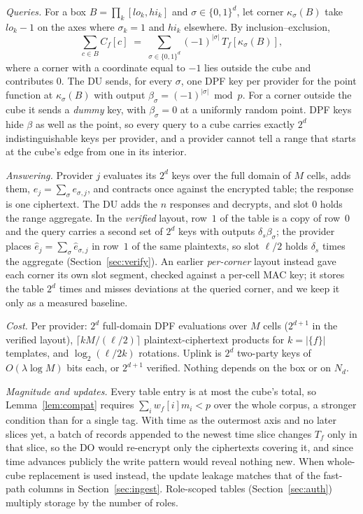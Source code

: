 \documentclass[a4paper,fleqn]{cas-sc}
\begin{document}
\emph{Queries.} For a box $B=\prod_k[\mathit{lo}_k,\mathit{hi}_k]$ and
$\sigma\in\{0,1\}^d$, let corner $\kappa_\sigma(B)$ take $\mathit{lo}_k-1$ on
the axes where $\sigma_k=1$ and $\mathit{hi}_k$ elsewhere. By
inclusion--exclusion,
\begin{equation}
\label{eq:ie}
\sum_{c\in B} C_f[c] \;=\; \sum_{\sigma\in\{0,1\}^d} (-1)^{|\sigma|}\,
T_f[\kappa_\sigma(B)],
\end{equation}
where a corner with a coordinate equal to $-1$ lies outside the cube and
contributes $0$. The DU sends, for every $\sigma$, one DPF key per provider
for the point function at $\kappa_\sigma(B)$ with output
$\beta_\sigma=(-1)^{|\sigma|}\bmod p$. For a corner outside the cube it sends a
\emph{dummy} key, with $\beta_\sigma=0$ at a uniformly random point. DPF keys
hide $\beta$ as well as the point, so every query to a cube carries exactly
$2^d$ indistinguishable keys per provider, and a provider cannot tell a range
that starts at the cube's edge from one in its interior.

\emph{Answering.} Provider $j$ evaluates its $2^d$ keys over the full domain of
$M$ cells, adds them, $e_j=\sum_\sigma e_{\sigma,j}$, and contracts once against
the encrypted table; the response is one ciphertext. The DU adds the $n$
responses and decrypts, and slot $0$ holds the range aggregate. In the
\emph{verified} layout, row~$1$ of the table is a copy of row~$0$ and the query
carries a second set of $2^d$ keys with outputs $\delta_s\beta_\sigma$; the
provider places $\hat e_j=\sum_\sigma\hat e_{\sigma,j}$ in row~$1$ of the same
plaintexts, so slot $\ell/2$ holds $\delta_s$ times the aggregate
(Section~\ref{sec:verify}). An earlier \emph{per-corner} layout instead gave
each corner its own slot segment, checked against a per-cell MAC key; it stores
the table $2^d$ times and misses deviations at the queried corner, and we keep
it only as a measured baseline.

\emph{Cost.} Per provider: $2^d$ full-domain DPF evaluations over $M$ cells
($2^{d+1}$ in the verified layout), $\lceil kM/(\ell/2)\rceil$
plaintext-ciphertext products for $k=|\{f\}|$ templates, and
$\log_2(\ell/2k)$ rotations. Uplink is $2^d$ two-party keys of
$O(\lambda\log M)$ bits each, or $2^{d+1}$ verified. Nothing depends on the box
or on $N_d$.

\emph{Magnitude and updates.} Every table entry is at most the cube's total,
so Lemma~\ref{lem:compat} requires $\sum_i w_f[i]m_i<p$ over the whole corpus,
a stronger condition than for a single tag. With time as the outermost axis
and no later slices yet, a batch of records appended to the newest time slice
changes $T_f$ only in that slice, so the DO would re-encrypt only the
ciphertexts covering it, and since time advances publicly the write pattern
would reveal nothing new. When whole-cube replacement is used instead, the update leakage matches
that of the fast-path columns in Section~\ref{sec:ingest}.
Role-scoped tables (Section~\ref{sec:auth}) multiply storage by the number of
roles.
\end{document}
